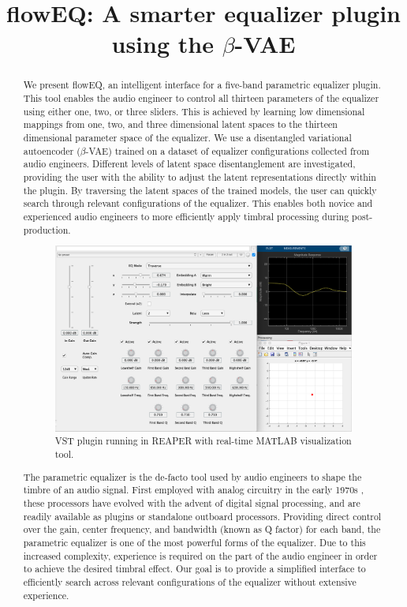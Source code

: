 \documentclass[a4paper]{article} %
\title{\MakeLowercase{flow}EQ: A smarter equalizer plugin using the $\beta$-VAE}
\begin{document}
\maketitle

\begin{abstract}


We present flowEQ, an intelligent interface for a five-band parametric equalizer plugin. 
This tool enables the audio engineer to control all thirteen parameters of the equalizer using either one, two, or three sliders. 
This is achieved by learning low dimensional mappings from one, two, and three dimensional latent spaces to the thirteen dimensional parameter space of the equalizer. 
We use a disentangled variational autoencoder ($\beta$-VAE) trained on a dataset of equalizer configurations collected from audio engineers. 
Different levels of latent space disentanglement are investigated, providing the user with the ability to adjust the latent representations directly within the plugin. 
By traversing the latent spaces of the trained models, the user can quickly search through relevant configurations of the equalizer. 
This enables both novice and experienced audio engineers to more efficiently apply timbral processing during post-production.


\begin{figure}[H]
  \centerline{
  \includegraphics[width=0.5\columnwidth]{../../img/full_visual.png}}
  \caption{VST plugin running in REAPER with real-time MATLAB visualization tool.}
  \label{fig:plugin}
 \end{figure}


The parametric equalizer is the de-facto tool used by audio engineers to shape the timbre of an audio signal. 
First employed with analog circuitry in the early 1970s \cite{massenburg}, these processors have evolved with the advent of digital signal processing, and are readily available as plugins or standalone outboard processors. 
Providing direct control over the gain, center frequency, and bandwidth (known as Q factor) for each band, the parametric equalizer is one of the most powerful forms of the equalizer. 
Due to this increased complexity, experience is required on the part of the audio engineer in order to achieve the desired timbral effect. 
Our goal is to provide a simplified interface to efficiently search across relevant configurations of the equalizer without extensive experience. 


\end{abstract}
\end{document}
